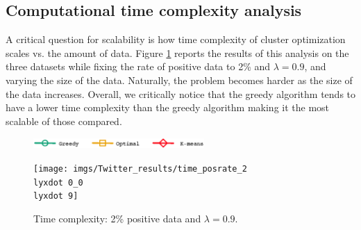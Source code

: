 \subsection{Computational time complexity analysis}


 A critical question for scalability is how time complexity of cluster optimization scales vs. the amount of data.  Figure \ref{fig:Time_vs_Data} reports the results of this analysis on the three datasets while fixing the rate of positive data to 2\% and $\lambda=0.9$, and varying the size of the data.
Naturally, the problem becomes harder as the size of the data increases.  
Overall, we critically notice that the greedy algorithm tends to have a lower time complexity than the greedy algorithm making it the most scalable of those compared.




\begin{figure}[H]
\begin{centering}
\includegraphics[width=6.5cm]{imgs/legend8}
\par\end{centering}
\begin{centering}
{\texttt{[image: imgs/Twitter\_results/time\_posrate\_2\\lyxdot 0\_0\\lyxdot 9]}}
\par\end{centering}
\caption{Time complexity: 2\% positive data and  $\lambda=0.9$.}
\label{fig:Time_vs_Data}
\end{figure}



